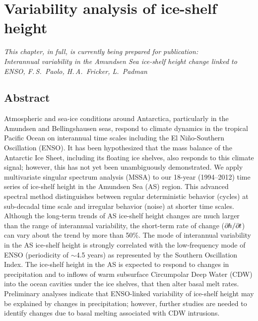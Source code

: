 


\chapter{Variability analysis of ice-shelf height}


{\sl
\noindent
This chapter, in full, is currently being prepared for publication:\\
Interannual variability in the Amundsen Sea ice-shelf height change linked to ENSO, F.\,S.~Paolo, H.\,A.~Fricker, L.~Padman\\
}

\section{Abstract}

Atmospheric and sea-ice conditions around Antarctica, particularly in the Amundsen and Bellingshausen seas, respond to climate dynamics in the tropical Pacific Ocean on interannual time scales including the El Ni\~no-Southern Oscillation (ENSO). It has been hypothesized that the mass balance of the Antarctic Ice Sheet, including its floating ice shelves, also responds to this climate signal; however, this has not yet been unambiguously demonstrated. We apply multivariate singular spectrum analysis (MSSA) to our 18-year (1994--2012) time series of ice-shelf height in the Amundsen Sea (AS) region. This advanced spectral method distinguishes between regular deterministic behavior (cycles) at sub-decadal time scale and irregular behavior (noise) at shorter time scales. Although the long-term trends of AS ice-shelf height changes are much larger than the range of interannual variability, the short-term rate of change ($\partial\mkern-1.5mu h/\partial\mkern-1.5mu t$) can vary about the trend by more than 50\%. The mode of interannual variability in the AS ice-shelf height is strongly correlated with the low-frequency mode of ENSO (periodicity of $\sim$4.5 years) as represented by the Southern Oscillation Index. The ice-shelf height in the AS is expected to respond to changes in precipitation and to inflows of warm subsurface Circumpolar Deep Water (CDW) into the ocean cavities under the ice shelves, that then alter basal melt rates. Preliminary analyses indicate that ENSO-linked variability of ice-shelf height may be explained by changes in precipitation; however, further studies are needed to identify changes due to basal melting associated with CDW intrusions.

